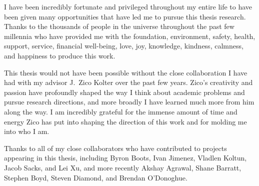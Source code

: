 \documentclass[12pt,masters]{cmuthesis}
\begin{document}
\begin{acknowledgments}
    I have been incredibly fortunate and privileged throughout
    my entire life to have been given many opportunities
    that have led me to pursue this thesis research.
    Thanks to the thousands of people in the universe throughout
    the past few millennia who have provided me with the
    foundation, environment, safety, health, support, service,
    financial well-being, love, joy, knowledge, kindness, calmness,
    and happiness to produce this work.

    This thesis would not have been possible without the close
    collaboration I have had with my advisor J.~Zico Kolter over
    the past few years.
    Zico's creativity and passion have profoundly shaped
    the way I think about academic problems and pursue
    research directions, and more broadly I have learned much
    more from him along the way.
    I am incredibly grateful for the immense
    amount of time and energy Zico has put into shaping the
    direction of this work and for molding me into who I am.

    Thanks to all of my close collaborators who have contributed
    to projects appearing in this thesis, including
    Byron Boots, Ivan Jimenez, Vladlen Koltun, Jacob Sacks, and Lei Xu,
    and more recently
    Akshay Agrawal,
    Shane Barratt,
    Stephen Boyd,
    Steven Diamond,
    and Brendan O'Donoghue.


\end{acknowledgments}
\end{document}

